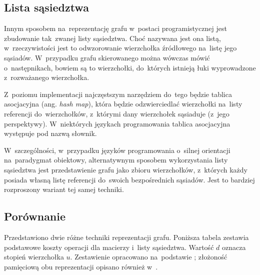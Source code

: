 \documentclass[11pt,a4paper,oneside]{report}
\begin{document}
\subsection{Lista sąsiedztwa}

Innym sposobem na~reprezentację grafu w~postaci programistycznej jest zbudowanie tak~zwanej listy sąsiedztwa. Choć nazywana jest ona listą, w~rzeczywistości jest to odwzorowanie wierzchołka źródłowego na~listę jego sąsiadów. W~przypadku grafu skierowanego można wówczas mówić o~następnikach, bowiem są to wierzchołki, do~których istnieją łuki wyprowadzone z~rozważanego wierzchołka.





Z~poziomu implementacji najczęstszym narzędziem do~tego będzie tablica asocjacyjna (ang. \textit{hash map}), która będzie odzwierciedlać wierzchołki na~listy referencji do~wierzchołków, z~którymi dany wierzchołek sąsiaduje (z~jego perspektywy). W~niektórych językach programowania tablica asocjacyjna występuje pod nazwą \glqq słownik\grqq{}.

W~szczególności, w~przypadku języków programowania o~silnej orientacji na~paradygmat obiektowy, alternatywnym sposobem wykorzystania listy sąsiedztwa jest przedstawienie grafu jako zbioru wierzchołków, z~których każdy posiada własną listę referencji do~swoich bezpośrednich sąsiadów. Jest to bardziej rozproszony wariant tej samej techniki.

\subsection{Porównanie}

Przedstawiono dwie różne techniki reprezentacji grafu. Poniższa tabela zestawia podstawowe koszty operacji dla macierzy i~listy sąsiedztwa. Wartość $d$ oznacza stopień wierzchołka $u$. Zestawienie opracowano na~podstawie \cite{learngraphtheory-2026-graphrepresentation}; złożoność pamięciową obu reprezentacji opisano również w~\cite{mit-2011-graphrepresentation}.
\end{document}
